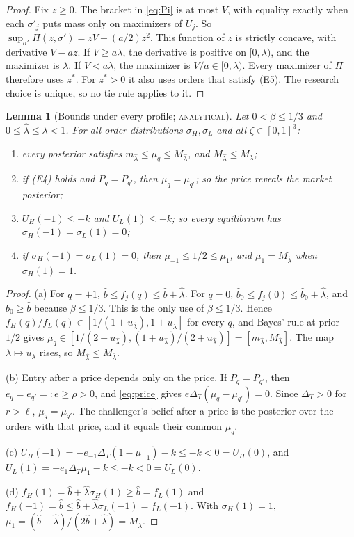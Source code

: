 \documentclass[12pt]{article}
\newtheorem{lemma}{Lemma}
\theoremstyle{definition}
\theoremstyle{remark}
\newcommand{\DT}{\Delta_T}
\newcommand{\lh}{\hat\lambda}
\newcommand{\lb}{\bar\lambda}
\newcommand{\st}[1]{\textsc{#1}}
\begin{document}
\begin{proof}
Fix $z\ge0$. The bracket in \eqref{eq:Pi} is at most $V$, with equality exactly when each $\sigma'_j$ puts mass
only on maximizers of $U_j$. So $\sup_{\sigma'}\Pi(z,\sigma')=zV-(a/2)z^2$. This function of $z$ is strictly
concave, with derivative $V-az$. If $V\ge a\lb$, the derivative is positive on $[0,\lb)$, and the maximizer is
$\lb$. If $V<a\lb$, the maximizer is $V/a\in[0,\lb)$. Every maximizer of $\Pi$ therefore uses $z^*$. For $z^*>0$
it also uses orders that satisfy (E5). The research choice is unique, so no tie rule applies to it.
\end{proof}

\begin{lemma}[Bounds under every profile; \st{analytical}]\label{lem:bounds}
Let $0<\beta\le1/3$ and $0\le\lh\le\lb<1$. For all order distributions $\sigma_H,\sigma_L$ and all
$\zeta\in[0,1]^3$:
\begin{enumerate}[label=(\alph*),nosep]
\item every posterior satisfies $m_{\lh}\le\mu_q\le M_{\lh}$, and $M_{\lh}\le M_{\lb}$;
\item if (E4) holds and $P_q=P_{q'}$, then $\mu_q=\mu_{q'}$; so the price reveals the market posterior;
\item $U_H(-1)\le-k$ and $U_L(1)\le-k$; so every equilibrium has $\sigma_H(-1)=\sigma_L(1)=0$;
\item if $\sigma_H(-1)=\sigma_L(1)=0$, then $\mu_{-1}\le1/2\le\mu_1$, and $\mu_1=M_{\lh}$ when $\sigma_H(1)=1$.
\end{enumerate}
\end{lemma}

\begin{proof}
(a) For $q=\pm1$, $\hat b\le f_j(q)\le\hat b+\lh$. For $q=0$, $\hat b_0\le f_j(0)\le\hat b_0+\lh$, and
$\hat b_0\ge\hat b$ because $\beta\le1/3$. This is the only use of $\beta\le1/3$. Hence
$f_H(q)/f_L(q)\in[1/(1+u_{\lh}),1+u_{\lh}]$ for every $q$, and Bayes' rule at prior $1/2$ gives
$\mu_q\in[1/(2+u_{\lh}),(1+u_{\lh})/(2+u_{\lh})]=[m_{\lh},M_{\lh}]$. The map $\lambda\mapsto u_\lambda$ rises,
so $M_{\lh}\le M_{\lb}$.

(b) Entry after a price depends only on the price. If $P_q=P_{q'}$, then $e_q=e_{q'}=:e\ge\rho>0$, and
\eqref{eq:price} gives $e\DT(\mu_q-\mu_{q'})=0$. Since $\DT>0$ for $r>\ell$, $\mu_q=\mu_{q'}$. The challenger's
belief after a price is the posterior over the orders with that price, and it equals their common $\mu_q$.

(c) $U_H(-1)=-e_{-1}\DT(1-\mu_{-1})-k\le-k<0=U_H(0)$, and $U_L(1)=-e_1\DT\mu_1-k\le-k<0=U_L(0)$.

(d) $f_H(1)=\hat b+\lh\sigma_H(1)\ge\hat b=f_L(1)$ and $f_H(-1)=\hat b\le\hat b+\lh\sigma_L(-1)=f_L(-1)$.
With $\sigma_H(1)=1$, $\mu_1=(\hat b+\lh)/(2\hat b+\lh)=M_{\lh}$.
\end{proof}
\end{document}
